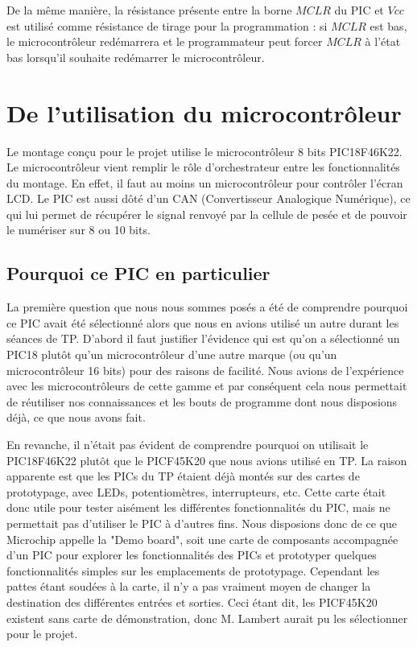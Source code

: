 \documentclass[a4paper,11pt,titlepage]{article}
\begin{document}
De la même manière, la résistance présente entre la borne $MCLR$ du PIC et $Vcc$ est utilisé comme résistance de tirage pour la programmation : si $MCLR$ est bas, le microcontrôleur redémarrera et le programmateur peut forcer $MCLR$ à l'état bas lorsqu'il souhaite redémarrer le microcontrôleur.

\section{De l'utilisation du microcontrôleur}
Le montage conçu pour le projet utilise le microcontrôleur 8 bits PIC18F46K22.
Le microcontrôleur vient remplir le rôle d'orchestrateur entre les fonctionnalités du montage. En effet, il faut au moins un microcontrôleur pour contrôler l'écran LCD. Le PIC est aussi dôté d'un CAN (Convertisseur Analogique Numérique), ce qui lui permet de récupérer le signal renvoyé par la cellule de pesée et de pouvoir le numériser sur 8 ou 10 bits.
\subsection{Pourquoi ce PIC en particulier}
La première question que nous nous sommes posés a été de comprendre pourquoi ce PIC avait été sélectionné alors que nous en avions utilisé un autre durant les séances de TP.
D'abord il faut justifier l'évidence qui est qu'on a sélectionné un PIC18 plutôt qu'un microcontrôleur d'une autre marque (ou qu'un microcontrôleur 16 bits) pour des raisons de facilité. Nous avions de l'expérience avec les microcontrôleurs de cette gamme et par conséquent cela nous permettait de réutiliser nos connaissances et les bouts de programme dont nous disposions déjà, ce que nous avons fait.

En revanche, il n'était pas évident de comprendre pourquoi on utilisait le PIC18F46K22 plutôt que le PICF45K20 que nous avions utilisé en TP. La raison apparente est que les PICs du TP étaient déjà montés sur des cartes de prototypage, avec LEDs, potentiomètres, interrupteurs, etc. Cette carte était donc utile pour tester aisément les différentes fonctionnalités du PIC, mais ne permettait pas d'utiliser le PIC à d'autres fins. Nous disposions donc de ce que Microchip appelle la "Demo board", soit une carte de composants accompagnée d'un PIC pour explorer les fonctionnalités des PICs et prototyper quelques fonctionnalités simples sur les emplacements de prototypage. Cependant les pattes étant soudées à la carte, il n'y a pas vraiment moyen de changer la destination des différentes entrées et sorties.
Ceci étant dit, les PICF45K20 existent sans carte de démonstration, donc M. Lambert aurait pu les sélectionner pour le projet.
\end{document}
